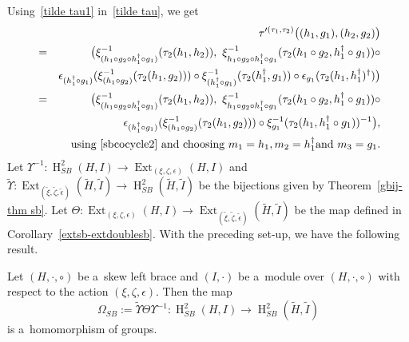 \documentclass{jonasart}
\theoremstyle{plain}
\DeclareMathOperator{\Ext}{Ext}
\DeclareMathOperator{\Ho}{H}
\begin{document}
	Using~\eqref{tilde tau1} in~\eqref{tilde tau}, we get
	\begin{eqnarray}
		&& \tau'^{(\tau_1,\tau_2 )}\big((h_1,g_1 ),(h_2,g_2 )\big) \nonumber\\
		&=&\big(\xi^{-1}_{(h_1\circ g_2\circ h_1^\dagger\circ g_1 )}(\tau_2 (h_1,h_2 )),~\xi^{-1}_{h_1\circ g_2\circ h_1^\dagger\circ g_1}(\tau_2 (h_1\circ g_2,h_1^\dagger \circ g_1 ))\circ \nonumber\\
		&& \epsilon_{(h_1^\dagger\circ g_1 )}(\xi^{-1}_{(h_1\circ g_2 )}(\tau_2 (h_1,g_2 ))) \circ \xi^{-1}_{(h_1^\dagger\circ g_1 )}(\tau_2 (h_1^\dagger,g_1 )) \circ \epsilon_{g_1}(\tau_2 (h_1,h_1^\dagger)^\dagger)\big)\nonumber\\
		&=&\big(\xi^{-1}_{(h_1\circ g_2\circ h_1^\dagger\circ g_1 )}(\tau_2 (h_1,h_2 )),~\xi^{-1}_{h_1\circ g_2\circ h_1^\dagger\circ g_1} (\tau_2 (h_1\circ g_2,h_1^\dagger \circ g_1 ))\circ\label{tau prime square}\\
		&& \epsilon_{(h_1^\dagger\circ g_1 )}(\xi^{-1}_{(h_1\circ g_2 )}(\tau_2 (h_1,g_2 )))\circ \xi^{-1}_{g_1}(\tau_2 (h_1,h_1^\dagger\circ g_1 ))^{-1}\big),\nonumber \\
		&& \text{using~\eqref{sbcocycle2} and choosing $m_1 =h_1, m_2 = h_1^\dagger \textrm{and}~m_3 = g_1$}.\nonumber
	\end{eqnarray}
	Let $\Upsilon^{-1}: \Ho^2_{SB}(H, I)\rightarrow \Ext_{(\xi, \zeta, \epsilon)}(H, I)$ and $\widetilde{\Upsilon}:\Ext_{(\widetilde{\xi}, \widetilde{\zeta}, \widetilde{\epsilon})}(\widetilde{H}, \widetilde{I}) \rightarrow \Ho^2_{SB}(\widetilde{H}, \widetilde{I})$ be the bijections given by Theorem~\ref{gbij-thm sb}. Let $\Theta: \Ext_{(\xi,\zeta,\epsilon)}(H, I) \to \Ext_{(\widetilde{\xi},\widetilde{\zeta},\widetilde{\epsilon})}(\widetilde{H},\widetilde{I})$ be the map defined in Corollary~\ref{extsb-extdoublesb}. With the preceding set-up, we have the following result.
	
	\begin{proposition}\label{homology homo SLB}
		Let $(H,\cdot,\circ)$ be a~skew left brace and $(I,\cdot)$ be a~module over $(H,\cdot,\circ)$ with respect to the action $(\xi,\zeta,\epsilon)$. Then the map
		\[
		\Omega_{SB}:=\widetilde{\Upsilon}\Theta\Upsilon^{-1}: \Ho^2_{SB}(H, I)\to\Ho^2_{SB}(\widetilde{H}, \widetilde{I})
		\]
		is a~homomorphism of groups.
	\end{proposition}
	
\end{document}
